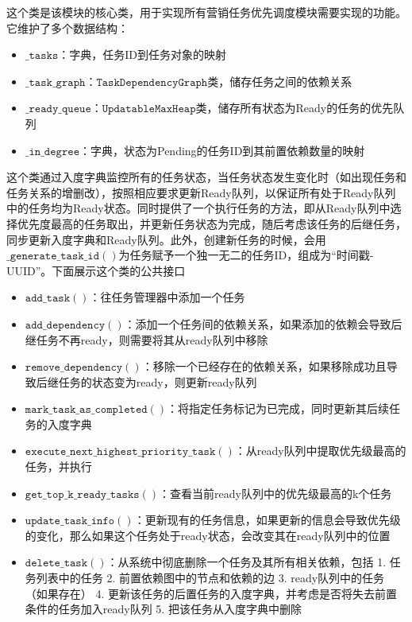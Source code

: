 \documentclass[cn,hazy,blue,10pt,normal]{elegantnote}
\begin{document}
这个类是该模块的核心类，用于实现所有营销任务优先调度模块需要实现的功能。它维护了多个数据结构：
\begin{itemize}
    \item $\mathtt{\_tasks}$：字典，任务ID到任务对象的映射
    \item $\mathtt{\_task\_graph}$：$\mathtt{TaskDependencyGraph}$类，储存任务之间的依赖关系
    \item $\mathtt{\_ready\_queue}$：$\mathtt{UpdatableMaxHeap}$类，储存所有状态为Ready的任务的优先队列
    \item $\mathtt{\_in\_degree}$：字典，状态为Pending的任务ID到其前置依赖数量的映射
\end{itemize}
这个类通过入度字典监控所有的任务状态，当任务状态发生变化时（如出现任务和任务关系的增删改），按照相应要求更新Ready队列，以保证所有处于Ready队列中的任务均为Ready状态。同时提供了一个执行任务的方法，即从Ready队列中选择优先度最高的任务取出，并更新任务状态为完成，随后考虑该任务的后继任务，同步更新入度字典和Ready队列。此外，创建新任务的时候，会用$\mathtt{\_generate\_task\_id()}$为任务赋予一个独一无二的任务ID，组成为“时间戳-UUID”。下面展示这个类的公共接口
\begin{itemize}
    \item $\mathtt{add\_task()}$：往任务管理器中添加一个任务
    \item $\mathtt{add\_dependency()}$：添加一个任务间的依赖关系，如果添加的依赖会导致后继任务不再ready，则需要将其从ready队列中移除
    \item $\mathtt{remove\_dependency()}$：移除一个已经存在的依赖关系，如果移除成功且导致后继任务的状态变为ready，则更新ready队列
    \item $\mathtt{mark\_task\_as\_completed()}$：将指定任务标记为已完成，同时更新其后续任务的入度字典
    \item $\mathtt{execute\_next\_highest\_priority\_task()}$：从ready队列中提取优先级最高的任务，并执行
    \item $\mathtt{get\_top\_k\_ready\_tasks()}$：查看当前ready队列中的优先级最高的k个任务
    \item $\mathtt{update\_task\_info()}$：更新现有的任务信息，如果更新的信息会导致优先级的变化，那么如果这个任务处于ready状态，会改变其在ready队列中的位置
    \item $\mathtt{delete\_task()}$：从系统中彻底删除一个任务及其所有相关依赖，包括
        1. 任务列表中的任务
        2. 前置依赖图中的节点和依赖的边
        3. ready队列中的任务（如果存在）
        4. 更新该任务的后置任务的入度字典，并考虑是否将失去前置条件的任务加入ready队列
        5. 把该任务从入度字典中删除
\end{itemize}
\end{document}
